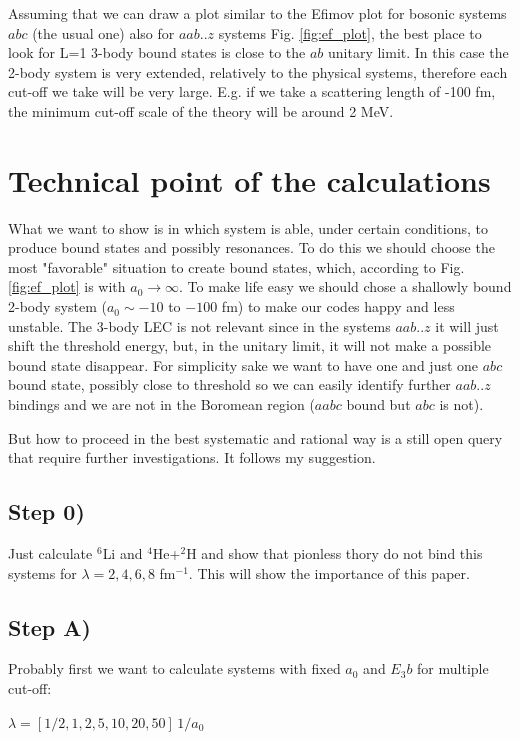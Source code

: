 \documentclass[aps,prd
,tightenlines,letterpaper,
nofootinbib]{revtex4-1}
\begin{document}
Assuming that we can draw a plot similar to the Efimov plot for bosonic systems $abc$ (the usual one) also for $aab..z$ systems Fig. \ref{fig:ef_plot}, the best place to look for L=1 3-body bound states is close to the $ab$ unitary limit.
In this case the 2-body system is very extended, relatively to the physical systems, therefore each cut-off we take will be very large.
E.g. if we take a scattering length of -100 fm, the minimum cut-off scale of the theory will be around 2 MeV.


\section{Technical point of the calculations}

What we want to show is in which system \eftnopi is able, under certain conditions, to produce bound states and possibly resonances.
To do this we should choose the most "favorable" situation to create bound states, which, according to Fig. \ref{fig:ef_plot} is with $a_0\rightarrow\infty$.
To make life easy we should chose a shallowly bound 2-body system ($a_0\sim-10$ to $-100$ fm) to make our codes happy and less unstable.
The 3-body LEC is not relevant since in the systems $aab..z$ it will just shift the threshold energy, but, in the unitary limit, it will not make a possible bound state disappear.
For simplicity sake we want to have one and just one $abc$ bound state, possibly close to threshold so we can easily identify further $aab..z$ bindings and we are not in the Boromean region ($aabc$ bound but $abc$ is not).

But how to proceed in the best systematic and rational way is a still open query that require further investigations. It follows my suggestion.

\subsection{Step 0)}
Just calculate $^6$Li and $^4$He+$^2$H and show that pionless thory do not bind this systems for $\lambda=2,4,6,8$ fm$^{-1}$.
This will show the importance of this paper.

\subsection{Step A)}
Probably first we want to calculate systems with fixed $a_0$ and $E_3b$ for multiple cut-off:

$\lambda = [1/2, 1,2,5,10,20,50]\, 1/a_0$
\end{document}

